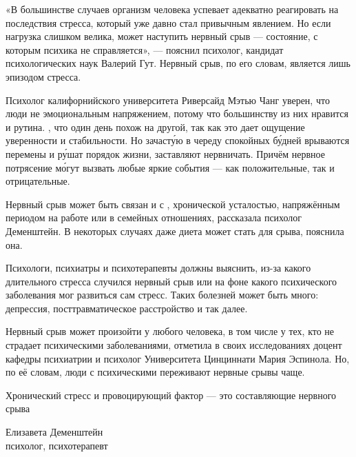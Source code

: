 «В большинстве случаев организм человека успевает адекватно реагировать на последствия стресса, который уже давно стал привычным явлением. Но если нагрузка слишком велика, может наступить нервный срыв  ---  состояние, с которым психика не справляется»,  ---  пояснил психолог, кандидат психологических наук Валерий Гут. Нервный срыв, по его словам, является лишь эпизодом  стресса.

Психолог калифорнийского университета Риверсайд Мэтью Чанг уверен, что люди не  эмоциональным напряжением, потому что большинству из них нравится  и рутина. , что один день похож на другой, так как это дает ощущение уверенности и стабильности. Но зачаст\'{у}ю в череду спокойных б\'{у}дней врываются перемены и р\'{у}шат  порядок жизни, заставляют нервничать. Причём нервное потрясение м\'{о}гут вызвать любые яркие события  ---  как положительные, так и отрицательные.

Нервный срыв может быть связан и с , хронической усталостью, напряжённым периодом на работе или в семейных отношениях, рассказала психолог Деменштейн. В некоторых случаях даже диета может стать  для срыва, пояснила она.

Психологи, психиатры и психотерапевты должны выяснить, из-за какого длительного стресса случился нервный срыв или на фоне какого психического заболевания мог развиться сам стресс. Таких болезней может быть много: депрессия, посттравматическое расстройство и так далее.

Нервный срыв может произойти у любого человека, в том числе у тех, кто не страдает психическими заболеваниями, отметила в своих исследованиях доцент кафедры психиатрии и психолог Университета Цинциннати Мария Эспинола. Но, по её словам, люди с психическими  переживают нервные срывы чаще.

\begin{fancyquotes}
    Хронический стресс и провоцирующий фактор  ---  это составляющие нервного срыва\\

    \begin{flushright}
        Елизавета Деменштейн\\
        психолог, психотерапевт
    \end{flushright}
\end{fancyquotes}

